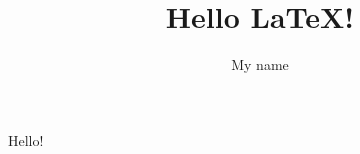 \documentclass{article} %
\title{Hello \LaTeX{}!} %
\author{My name}        %
\begin{document}
 
\maketitle
Hello!                  %
\end{document}
